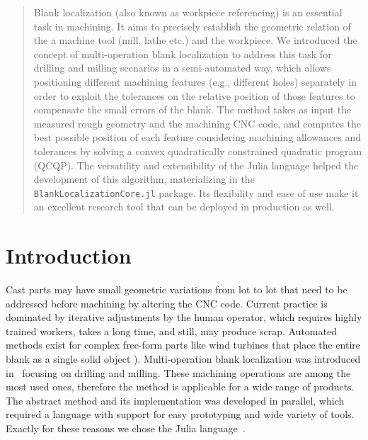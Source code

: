 \documentclass{juliacon}
\begin{document}


\maketitle

\begin{abstract}

Blank localization (also known as workpiece referencing) is an essential task in machining. 
It aims to precisely establish the geometric relation of the a machine tool (mill, lathe etc.) and the workpiece.
We introduced the concept of multi-operation blank localization to address this task for drilling and milling scenarios in a semi-automated way, which allows positioning different machining features (e.g., different holes) separately in order to exploit the tolerances on the relative position of those features to compensate the small errors of the blank. 
The method takes as input the measured rough geometry and the machining CNC code, and computes the best possible position of each feature considering machining allowances and tolerances by solving a convex quadratically constrained quadratic program (QCQP).
The versatility and extensibility of the Julia language helped the development of this algorithm, materializing in the \texttt{BlankLocalizationCore.jl} package.
Its flexibility and ease of use make it an excellent research tool that can be deployed in production as well.
\end{abstract}

\section{Introduction}
\label{sec:intro}
Cast parts may have small geometric variations from lot to lot that need to be addressed before machining by altering the CNC code.
Current practice is dominated by iterative adjustments by the human operator, which requires highly trained workers, takes a long time, and still, may produce scrap.
Automated methods exist for complex free-form parts like wind turbines that place the entire blank as a single solid object 
\cite{tan:2014_UnconstrainedApproachBlank}\cite{ding:2021_CoarsefineOptimizationMethod}).
Multi-operation blank localization was introduced in~\cite{cserteg:2023_Annals} focusing on drilling and milling.
These machining operations are among the most used ones, therefore the method is applicable for a wide range of products.
The abstract method and its implementation was developed in parallel, which required a language with support for easy prototyping and wide variety of tools.
Exactly for these reasons we chose the Julia language~\cite{bezanson2017julia}.
\end{document}
